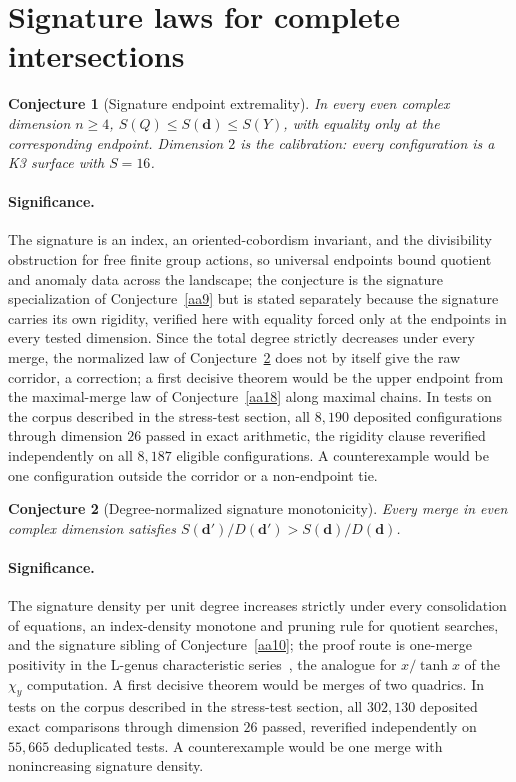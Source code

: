 \documentclass[11pt]{article}
\newtheorem{conjecture}{Conjecture}
\theoremstyle{definition}
\begin{document}
\section{Signature laws for complete intersections}

\begin{conjecture}[Signature endpoint extremality]\label{aa16}
In every even complex dimension $n\ge4$, $S(Q)\le S(\mathbf d)\le S(Y)$, with equality only at the corresponding endpoint.  Dimension $2$ is the calibration: every configuration is a K3 surface with $S=16$.
\end{conjecture}

\paragraph{Significance.}
The signature is an index, an oriented-cobordism invariant, and the divisibility obstruction for free finite group actions, so universal endpoints bound quotient and anomaly data across the landscape; the conjecture is the signature specialization of Conjecture~\ref{aa9} but is stated separately because the signature carries its own rigidity, verified here with equality forced only at the endpoints in every tested dimension.  Since the total degree strictly decreases under every merge, the normalized law of Conjecture~\ref{aa17} does not by itself give the raw corridor, a correction; a first decisive theorem would be the upper endpoint from the maximal-merge law of Conjecture~\ref{aa18} along maximal chains.  In tests on the corpus described in the stress-test section, all $8{,}190$ deposited configurations through dimension $26$ passed in exact arithmetic, the rigidity clause reverified independently on all $8{,}187$ eligible configurations.  A counterexample would be one configuration outside the corridor or a non-endpoint tie.

\begin{conjecture}[Degree-normalized signature monotonicity]\label{aa17}
Every merge in even complex dimension satisfies $S(\mathbf d')/D(\mathbf d')>S(\mathbf d)/D(\mathbf d)$.
\end{conjecture}

\paragraph{Significance.}
The signature density per unit degree increases strictly under every consolidation of equations, an index-density monotone and pruning rule for quotient searches, and the signature sibling of Conjecture~\ref{aa10}; the proof route is one-merge positivity in the L-genus characteristic series~\cite{Hir66}, the analogue for $x/\tanh x$ of the $\chi_y$ computation.  A first decisive theorem would be merges of two quadrics.  In tests on the corpus described in the stress-test section, all $302{,}130$ deposited exact comparisons through dimension $26$ passed, reverified independently on $55{,}665$ deduplicated tests.  A counterexample would be one merge with nonincreasing signature density.
\end{document}
